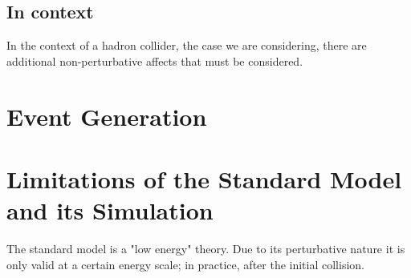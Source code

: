 \subsection{In context}
In the context of a hadron collider, the case we are considering, there are additional non-perturbative affects that must be considered.
\section{Event Generation}\label{sec2:mc}
\subsection{}
\section{Limitations of the Standard Model and its Simulation}\label{sec3:limits}
The standard model is a "low energy" theory. Due to its perturbative nature it is only valid at a certain energy scale; in practice, after the initial collision. 
